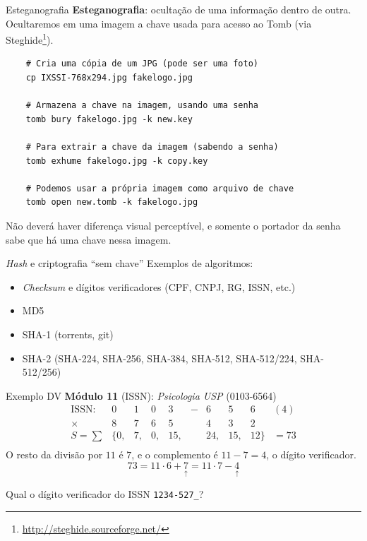 \documentclass[utf8]{beamer}
\newcommand{\challengeFive}[0]{1234-527\_}
\begin{document}
\begin{frame}[fragile]{Esteganografia}
  \textbf{Esteganografia}: ocultação de uma informação dentro de outra.
  Ocultaremos em uma imagem a chave usada
  para acesso ao Tomb (via Steghide\footnote{
    \url{http://steghide.sourceforge.net/}
  }).
  \vfill
  \begin{verbatim}
    # Cria uma cópia de um JPG (pode ser uma foto)
    cp IXSSI-768x294.jpg fakelogo.jpg

    # Armazena a chave na imagem, usando uma senha
    tomb bury fakelogo.jpg -k new.key

    # Para extrair a chave da imagem (sabendo a senha)
    tomb exhume fakelogo.jpg -k copy.key

    # Podemos usar a própria imagem como arquivo de chave
    tomb open new.tomb -k fakelogo.jpg
  \end{verbatim}
  \vfill
  Não deverá haver diferença visual perceptível,
  e somente o portador da senha sabe que há uma chave nessa imagem.
\end{frame}


\begin{frame}{\emph{Hash} e criptografia ``sem chave''}
  Exemplos de algoritmos:
  \begin{itemize}
    \item \emph{Checksum} e dígitos verificadores
          (CPF, CNPJ, RG, ISSN, etc.)
    \item MD5
    \item SHA-1 (torrents, git)
    \item SHA-2 (SHA-224, SHA-256, SHA-384, SHA-512,
                 SHA-512/224, SHA-512/256)
  \end{itemize}
  \vspace{.5em}
  \vfill
  Exemplo DV \textbf{Módulo 11} (ISSN):
  \emph{Psicologia USP} (0103-6564)
  \[
  \begin{array}{rccccccccl}
    \text{ISSN:} &  0 &  1 &  0 &  3 & - &  6 &  5 &  6 & (4) \\
          \times &  8 &  7 &  6 &  5 &   &  4 &  3 &  2 \\ \hline
      S = \sum & \{ 0,&  7,&  0,& 15,&   & 24,& 15,& 12 \} & = 73 \\
  \end{array}
  \]
  O resto da divisão por $11$ é $7$, e o complemento é $11 - 7 = 4$,
  o dígito verificador.
  \[
  73 = 11 \cdot 6 + {\underset{\uparrow}{7}} =
       11 \cdot 7 - {\underset{\uparrow}{4}}
  \]
  \begin{center}\Large
    Qual o dígito verificador do ISSN \texttt{\challengeFive}?
  \end{center}
\end{frame}
\end{document}
